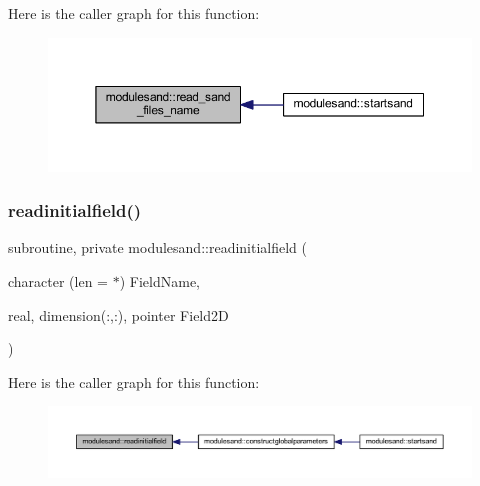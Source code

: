 Here is the caller graph for this function\+:\nopagebreak
\begin{figure}[H]
\begin{center}
\leavevmode
\includegraphics[width=350pt]{namespacemodulesand_af5d461af239929ac66d30206f4a6d982_icgraph}
\end{center}
\end{figure}
\mbox{\label{namespacemodulesand_aa61dae13b284d7fedb73976eb0340e68}} 
\subsubsection{\texorpdfstring{readinitialfield()}{readinitialfield()}}
{\footnotesize\ttfamily subroutine, private modulesand\+::readinitialfield (\begin{DoxyParamCaption}\item[{character (len = $\ast$)}]{Field\+Name,  }\item[{real, dimension(\+:,\+:), pointer}]{Field2D }\end{DoxyParamCaption})\hspace{0.3cm}{\ttfamily [private]}}

Here is the caller graph for this function\+:\nopagebreak
\begin{figure}[H]
\begin{center}
\leavevmode
\includegraphics[width=350pt]{namespacemodulesand_aa61dae13b284d7fedb73976eb0340e68_icgraph}
\end{center}
\end{figure}
\mbox{\label{namespacemodulesand_a3bbda76d81b4711c3b088303a6953f52}} 
